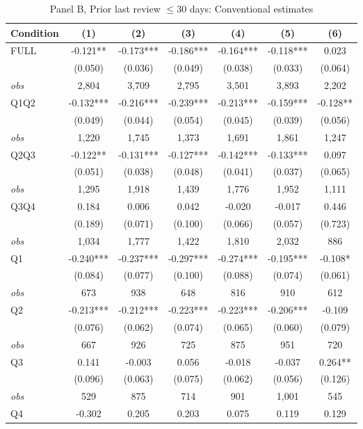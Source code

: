 \begin{table}[!htbp]
\centering
\caption{Panel B, Prior last review $\leq 30$ days: Conventional estimates}
\label{tab:trim00:b:prior_last_review_le30d}
\small
\begin{tabular}{lcccccc}
\toprule
Condition & (1) & (2) & (3) & (4) & (5) & (6) \\
\midrule
FULL & -0.121** & -0.173*** & -0.186*** & -0.164*** & -0.118*** & 0.023 \\
 & (0.050) & (0.036) & (0.049) & (0.038) & (0.033) & (0.064) \\
\textit{obs} & 2,804 & 3,709 & 2,795 & 3,501 & 3,893 & 2,202 \\
Q1Q2 & -0.132*** & -0.216*** & -0.239*** & -0.213*** & -0.159*** & -0.128** \\
 & (0.049) & (0.044) & (0.054) & (0.045) & (0.039) & (0.056) \\
\textit{obs} & 1,220 & 1,745 & 1,373 & 1,691 & 1,861 & 1,247 \\
Q2Q3 & -0.122** & -0.131*** & -0.127*** & -0.142*** & -0.133*** & 0.097 \\
 & (0.051) & (0.038) & (0.048) & (0.041) & (0.037) & (0.065) \\
\textit{obs} & 1,295 & 1,918 & 1,439 & 1,776 & 1,952 & 1,111 \\
Q3Q4 & 0.184 & 0.006 & 0.042 & -0.020 & -0.017 & 0.446 \\
 & (0.189) & (0.071) & (0.100) & (0.066) & (0.057) & (0.723) \\
\textit{obs} & 1,034 & 1,777 & 1,422 & 1,810 & 2,032 &   886 \\
Q1 & -0.240*** & -0.237*** & -0.297*** & -0.274*** & -0.195*** & -0.108* \\
 & (0.084) & (0.077) & (0.100) & (0.088) & (0.074) & (0.061) \\
\textit{obs} & 673 & 938 & 648 & 816 & 910 & 612 \\
Q2 & -0.213*** & -0.212*** & -0.223*** & -0.223*** & -0.206*** & -0.109 \\
 & (0.076) & (0.062) & (0.074) & (0.065) & (0.060) & (0.079) \\
\textit{obs} & 667 & 926 & 725 & 875 & 951 & 720 \\
Q3 & 0.141 & -0.003 & 0.056 & -0.018 & -0.037 & 0.264** \\
 & (0.096) & (0.063) & (0.075) & (0.062) & (0.056) & (0.126) \\
\textit{obs} &   529 &   875 &   714 &   901 & 1,001 &   545 \\
Q4 & -0.302 & 0.205 & 0.203 & 0.075 & 0.119 & 0.129 \\

\end{tabular}
\end{table}
